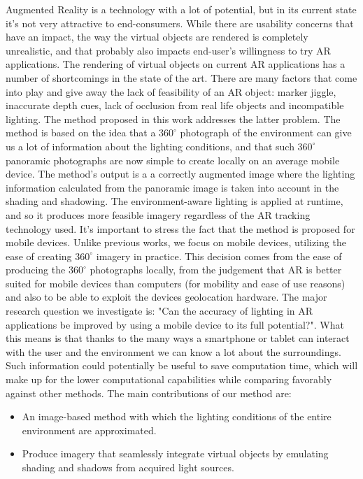 Augmented Reality is a technology with a lot of potential, but in its current state it's not very attractive to end-consumers. While there are usability concerns that have an impact, the way the virtual objects are rendered is completely unrealistic, and that probably also impacts end-user's willingness to try AR applications.
The rendering of virtual objects on current AR applications has a number of shortcomings in the state of the art. There are many factors that come into play and give away the lack of feasibility of an AR object: marker jiggle, inaccurate depth cues, lack of occlusion from real life objects and incompatible lighting.
The method proposed in this work addresses the latter problem. The method is based on the idea that a $360^{\circ}$  photograph of the environment can give us a lot of information about the lighting conditions, and that such $360^{\circ}$  panoramic photographs are now simple to create locally on an average mobile device. \newline
The method's output is a a correctly augmented image where the lighting information calculated from the panoramic image is taken into account in the shading and shadowing. The environment-aware lighting is applied at runtime, and so it produces more feasible imagery regardless of the AR tracking technology used.\newline
It's important to stress the fact that the method is proposed for mobile devices. Unlike previous works, we focus on mobile devices, utilizing the ease of creating $360^{\circ}$ imagery in practice. This decision comes from the ease of producing the $360^{\circ}$  photographs locally, from the judgement that AR is better suited for mobile devices than computers (for mobility and ease of use reasons) and also to be able to exploit the devices geolocation hardware.\newline
The major research question we investigate is: "Can the accuracy of lighting in AR applications be improved by using a mobile device to its full potential?". What this means is that thanks to the many ways a smartphone or tablet can interact with the user and the environment we can know a lot about the surroundings. Such information could potentially be useful to save computation time, which will make up for the lower computational capabilities while comparing favorably against other methods.\newline
The main contributions of our method are:
\begin{itemize}
    \item An image-based method with which the lighting conditions of the entire environment are approximated.
    \item Produce imagery that seamlessly integrate virtual objects by emulating shading and shadows from acquired light sources.
\end{itemize}